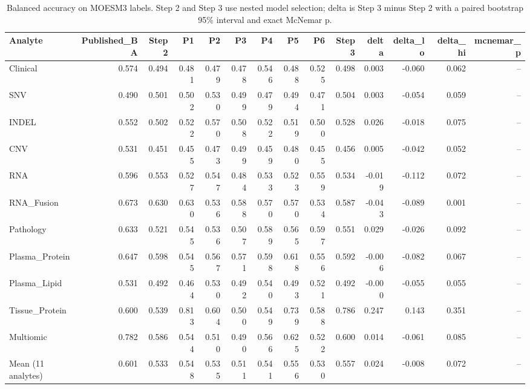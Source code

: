 \begin{table}[t]
\centering
\caption{Balanced accuracy on MOESM3 labels. Step 2 and Step 3 use nested model selection; delta is Step 3 minus Step 2 with a paired bootstrap 95\% interval and exact McNemar p.}
\begin{tabular}{lrrrrrrrrrrrrr}
\hline
Analyte & Published\_BA & Step2 & P1 & P2 & P3 & P4 & P5 & P6 & Step3 & delta & delta\_lo & delta\_hi & mcnemar\_p \\
\hline
Clinical & 0.574 & 0.494 & 0.481 & 0.479 & 0.478 & 0.546 & 0.488 & 0.525 & 0.498 & 0.003 & -0.060 & 0.062 & -- \\
SNV & 0.490 & 0.501 & 0.502 & 0.530 & 0.499 & 0.479 & 0.494 & 0.471 & 0.504 & 0.003 & -0.054 & 0.059 & -- \\
INDEL & 0.552 & 0.502 & 0.522 & 0.570 & 0.508 & 0.522 & 0.519 & 0.500 & 0.528 & 0.026 & -0.018 & 0.075 & -- \\
CNV & 0.531 & 0.451 & 0.455 & 0.473 & 0.499 & 0.459 & 0.480 & 0.455 & 0.456 & 0.005 & -0.042 & 0.052 & -- \\
RNA & 0.596 & 0.553 & 0.527 & 0.547 & 0.484 & 0.533 & 0.523 & 0.559 & 0.534 & -0.019 & -0.112 & 0.072 & -- \\
RNA\_Fusion & 0.673 & 0.630 & 0.630 & 0.536 & 0.588 & 0.570 & 0.570 & 0.534 & 0.587 & -0.043 & -0.089 & 0.001 & -- \\
Pathology & 0.633 & 0.521 & 0.545 & 0.536 & 0.507 & 0.589 & 0.565 & 0.597 & 0.551 & 0.029 & -0.026 & 0.092 & -- \\
Plasma\_Protein & 0.647 & 0.598 & 0.545 & 0.567 & 0.571 & 0.598 & 0.618 & 0.556 & 0.592 & -0.006 & -0.082 & 0.067 & -- \\
Plasma\_Lipid & 0.531 & 0.492 & 0.464 & 0.530 & 0.492 & 0.540 & 0.493 & 0.521 & 0.492 & -0.000 & -0.055 & 0.055 & -- \\
Tissue\_Protein & 0.600 & 0.539 & 0.813 & 0.604 & 0.500 & 0.549 & 0.739 & 0.588 & 0.786 & 0.247 & 0.143 & 0.351 & -- \\
Multiomic & 0.782 & 0.586 & 0.544 & 0.510 & 0.490 & 0.566 & 0.625 & 0.522 & 0.600 & 0.014 & -0.061 & 0.085 & -- \\
Mean (11 analytes) & 0.601 & 0.533 & 0.548 & 0.535 & 0.511 & 0.541 & 0.556 & 0.530 & 0.557 & 0.024 & -0.008 & 0.072 & -- \\
\hline
\end{tabular}
\end{table}
